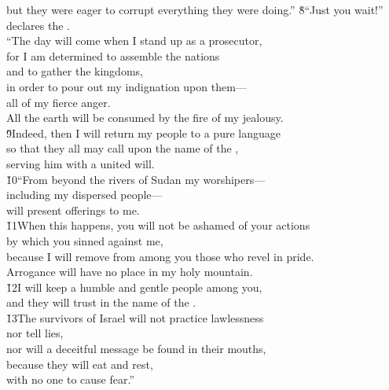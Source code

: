 \begin{poetry}
\poemll    but they were eager to corrupt everything they were doing.''
\poeml \v{8}``Just you wait!'' declares the . \\
\poemll    ``The day will come when I stand up as a prosecutor, \\
\poeml for I am determined to assemble the nations \\
\poemll    and to gather the kingdoms, \\
\poeml in order to pour out my indignation upon them--- \\
\poemll    all of my fierce anger. \\
\poeml All the earth will be consumed by the fire of my jealousy. \\
\poeml \v{9}Indeed, then I will return my people to a pure language \\
\poemll    so that they all may call upon the name of the , \\
\poemlll       serving him with a united will. \\
\poeml \v{10}``From beyond the rivers of Sudan my worshipers--- \\
\poemll    including my dispersed people--- \\
\poemlll       will present offerings to me. \\
\poeml \v{11}When this happens, you will not be ashamed of your actions \\
\poemll    by which you sinned against me, \\
\poeml because I will remove from among you those who revel in pride. \\
\poemll    Arrogance will have no place in my holy mountain. \\
\poeml \v{12}I will keep a humble and gentle people among you, \\
\poemll    and they will trust in the name of the . \\
\poeml \v{13}The survivors of Israel will not practice lawlessness \\
\poemll    nor tell lies, \\
\poeml nor will a deceitful message be found in their mouths, \\
\poemll    because they will eat and rest, \\
\poemlll       with no one to cause fear.''

\end{poetry}
